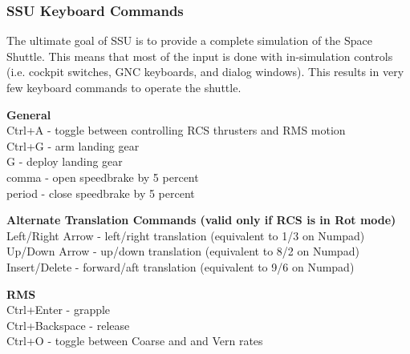 \documentclass[13pt]{article}
\begin{document}
\subsubsection{SSU Keyboard Commands}
The ultimate goal of SSU is to provide a complete simulation of the Space Shuttle.  This means that most of the input is done with in-simulation controls (i.e. cockpit switches, GNC keyboards, and dialog windows). This results in very few keyboard commands to operate the shuttle.

\begin{center}
  \textbf{General}\\
  Ctrl+A - toggle between controlling RCS thrusters and RMS motion\\
  Ctrl+G - arm landing gear\\
  G - deploy landing gear\\
  comma - open speedbrake by 5 percent\\
  period - close speedbrake by 5 percent\\
  \vspace{\baselineskip}

  \textbf{Alternate Translation Commands (valid only if RCS is in Rot mode)}\\
  Left/Right Arrow - left/right translation (equivalent to 1/3 on Numpad)\\
  Up/Down Arrow - up/down translation (equivalent to 8/2 on Numpad)\\
  Insert/Delete - forward/aft translation (equivalent to 9/6 on Numpad)\\
  \vspace{\baselineskip}

  \textbf{RMS}\\
  Ctrl+Enter - grapple\\
  Ctrl+Backspace - release\\
  Ctrl+O - toggle between Coarse and and Vern rates\\
\end{center}
\end{document}
